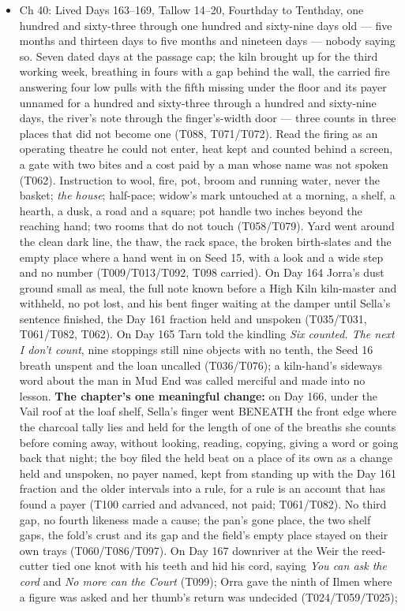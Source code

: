 \documentclass{design/chronicle}
\begin{document}
{\begin{itemize}[leftmargin=1.4em,itemsep=1pt,topsep=3pt,parsep=0pt]
\end{itemize}

\begin{itemize}[leftmargin=1.4em,itemsep=1pt,topsep=3pt,parsep=0pt]

\item Ch 40: Lived Days 163–169, Tallow 14–20, Fourthday to Tenthday, one hundred and sixty-three through one hundred and sixty-nine days old — five months and thirteen days to five months and nineteen days — nobody saying so. Seven dated days at the passage cap; the kiln brought up for the third working week, breathing in fours with a gap behind the wall, the carried fire answering four low pulls with the fifth missing under the floor and its payer unnamed for a hundred and sixty-three through a hundred and sixty-nine days, the river’s note through the finger’s-width door — three counts in three places that did not become one (T088, T071/T072). Read the firing as an operating theatre he could not enter, heat kept and counted behind a screen, a gate with two bites and a cost paid by a man whose name was not spoken (T062). Instruction to wool, fire, pot, broom and running water, never the basket; \emph{the house}; half-pace; widow’s mark untouched at a morning, a shelf, a hearth, a dusk, a road and a square; pot handle two inches beyond the reaching hand; two rooms that do not touch (T058/T079). Yard went around the clean dark line, the thaw, the rack space, the broken birth-slates and the empty place where a hand went in on Seed 15, with a look and a wide step and no number (T009/T013/T092, T098 carried). On Day 164 Jorra’s dust ground small as meal, the full note known before a High Kiln kiln-master and withheld, no pot lost, and his bent finger waiting at the damper until Sella’s sentence finished, the Day 161 fraction held and unspoken (T035/T031, T061/T082, T062). On Day 165 Tarn told the kindling \emph{Six counted. The next I don’t count}, nine stoppings still nine objects with no tenth, the Seed 16 breath unspent and the loan uncalled (T036/T076); a kiln-hand’s sideways word about the man in Mud End was called merciful and made into no lesson. \textbf{The chapter’s one meaningful change:} on Day 166, under the Vail roof at the loaf shelf, Sella’s finger went BENEATH the front edge where the charcoal tally lies and held for the length of one of the breaths she counts before coming away, without looking, reading, copying, giving a word or going back that night; the boy filed the held beat on a place of its own as a change held and unspoken, no payer named, kept from standing up with the Day 161 fraction and the older intervals into a rule, for a rule is an account that has found a payer (T100 carried and advanced, not paid; T061/T082). No third gap, no fourth likeness made a cause; the pan’s gone place, the two shelf gaps, the fold’s crust and its gap and the field’s empty place stayed on their own trays (T060/T086/T097). On Day 167 downriver at the Weir the reed-cutter tied one knot with his teeth and hid his cord, saying \emph{You can ask the cord} and \emph{No more can the Court} (T099); Orra gave the ninth of Ilmen where a figure was asked and her thumb’s return was undecided (T024/T059/T025); 
\end{itemize}}
\end{document}
